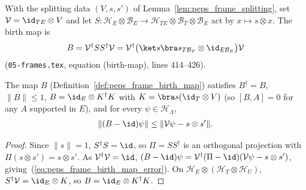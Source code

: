 \begin{definition}
    \label{def:peps_frame_birth_map}
    \leanok
    With the splitting data $(V,s,s')$ of Lemma~\ref{lem:peps_frame_splitting},
    set $\mathcal V=\id_{TE}\otimes V$ and let
    $S\colon\mathcal H_E\otimes\mathcal B_E\to\mathcal H_{TE}\otimes\mathcal B_T\otimes\mathcal B_E$
    act by $x\mapsto s\otimes x$. The birth map is
    \begin{align}
        B=\mathcal V^\dagger SS^\dagger\mathcal V
        =\mathcal V^\dagger\bigl(\ket s\bra s_{T\mathcal B_T}
        \otimes\id_{E\mathcal B_E}\bigr)\mathcal V
        \label{eq:peps_frame_birth_map}
    \end{align}
    (\texttt{05-frames.tex}, equation (birth-map), lines 414--426).
\end{definition}

\begin{lemma}
    \label{lem:peps_frame_birth_map}
    \leanok
    The map $B$ (Definition~\ref{def:peps_frame_birth_map}) satisfies
    $B^\dagger=B$, $\|B\|\le 1$, $B=\id_E\otimes K^\dagger K$ with
    $K=\bra s(\id_T\otimes V)$ (so $[B,A]=0$ for any $A$ supported in $E$), and
    for every $\psi\in\mathcal H_\Lambda$,
    \begin{align}
        \lVert(B-\id)\psi\rVert\le\lVert\mathcal V\psi-s\otimes s'\rVert .
        \label{eq:peps_frame_birth_map_error}
    \end{align}
\end{lemma}

\begin{proof}\leanok
    Since $\lVert s\rVert=1$, $S^\dagger S=\id$, so $\Pi=SS^\dagger$ is an
    orthogonal projection with $\Pi(s\otimes s')=s\otimes s'$. As
    $\mathcal V^\dagger\mathcal V=\id$,
    $(B-\id)\psi=\mathcal V^\dagger(\Pi-\id)(\mathcal V\psi-s\otimes s')$,
    giving~(\ref{eq:peps_frame_birth_map_error}). On
    $\mathcal H_E\otimes(\mathcal H_T\otimes\mathcal H_U)$,
    $S^\dagger\mathcal V=\id_E\otimes K$, so $B=\id_E\otimes K^\dagger K$.
\end{proof}

